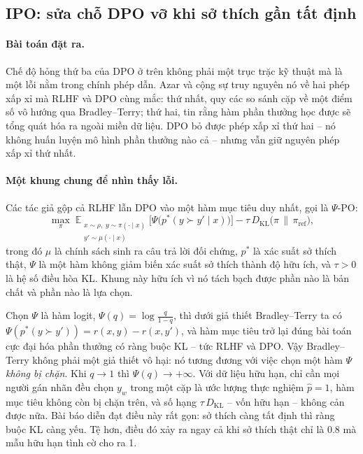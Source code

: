 \subsection{IPO: sửa chỗ DPO vỡ khi sở thích gần tất định}
\label{ssec:ipo}

\paragraph{Bài toán đặt ra.}
Chế độ hỏng thứ ba của DPO ở trên không phải một trục trặc kỹ thuật mà là một lỗi nằm trong chính phép dẫn. Azar và cộng sự \cite{azar2024ipo} truy nguyên nó về hai phép xấp xỉ mà RLHF và DPO cùng mắc: thứ nhất, quy các so sánh cặp về một điểm số vô hướng qua Bradley--Terry; thứ hai, tin rằng hàm phần thưởng học được sẽ tổng quát hóa ra ngoài miền dữ liệu. DPO bỏ được phép xấp xỉ thứ hai -- nó không huấn luyện mô hình phần thưởng nào cả -- nhưng vẫn giữ nguyên phép xấp xỉ thứ nhất.

\paragraph{Một khung chung để nhìn thấy lỗi.}
Các tác giả gộp cả RLHF lẫn DPO vào một hàm mục tiêu duy nhất, gọi là \( \Psi \)-PO:
\[
    \max_{\pi}\;
    \mathbb{E}_{\substack{x \sim \rho,\; y \sim \pi(\cdot \mid x) \\ y' \sim \mu(\cdot \mid x)}}
    \Big[ \Psi\big( p^{*}(y \succ y' \mid x) \big) \Big]
    - \tau\, D_{\text{KL}}\big(\pi \,\|\, \pi_{\text{ref}}\big),
\]
trong đó \( \mu \) là chính sách sinh ra câu trả lời đối chứng, \( p^{*} \) là xác suất sở thích thật, \( \Psi \) là một hàm không giảm biến xác suất sở thích thành độ hữu ích, và \( \tau > 0 \) là hệ số điều hòa KL. Khung này hữu ích vì nó tách bạch được phần nào là bản chất và phần nào là lựa chọn.

Chọn \( \Psi \) là hàm logit, \( \Psi(q) = \log\frac{q}{1-q} \), thì dưới giả thiết Bradley--Terry ta có \( \Psi(p^{*}(y \succ y')) = r(x,y) - r(x,y') \), và hàm mục tiêu trở lại đúng bài toán cực đại hóa phần thưởng có ràng buộc KL -- tức RLHF và DPO. Vậy Bradley--Terry không phải một giả thiết vô hại: nó tương đương với việc chọn một hàm \( \Psi \) \emph{không bị chặn}. Khi \( q \to 1 \) thì \( \Psi(q) \to +\infty \). Với dữ liệu hữu hạn, chỉ cần mọi người gán nhãn đều chọn \( y_w \) trong một cặp là ước lượng thực nghiệm \( \hat{p} = 1 \), hàm mục tiêu không còn bị chặn trên, và số hạng \( \tau\, D_{\text{KL}} \) -- vốn hữu hạn -- không cản được nữa. Bài báo diễn đạt điều này rất gọn: sở thích càng tất định thì ràng buộc KL càng yếu. Tệ hơn, điều đó xảy ra ngay cả khi sở thích thật chỉ là 0.8 mà mẫu hữu hạn tình cờ cho ra 1.

